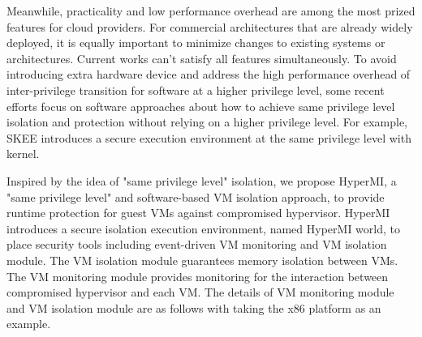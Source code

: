 \documentclass[conference]{IEEEtran}
\begin{document}
Meanwhile, practicality and low performance overhead are among the most prized features for cloud providers. For commercial architectures that are already widely deployed, it is equally important to minimize changes to existing systems or architectures. Current works can't satisfy all features simultaneously. To avoid introducing extra hardware device and address the high performance overhead of inter-privilege transition for software at a higher privilege level, some recent efforts focus on software approaches about how to achieve same privilege level isolation and protection without relying on a higher privilege level. For example, SKEE\cite{Azab2016SKEE} introduces a secure execution environment at the same privilege level with kernel. 


Inspired by the idea of "same privilege level" isolation, we propose HyperMI, a "same privilege level" and software-based VM isolation approach, to provide runtime protection for guest VMs against compromised hypervisor. HyperMI introduces a secure isolation execution environment, named HyperMI world, to place security tools including event-driven VM monitoring and VM isolation module. The VM isolation module guarantees memory isolation between VMs. The VM monitoring module provides monitoring for the interaction between compromised hypervisor and each VM. The details of VM monitoring module and VM isolation module are as follows with taking the x86 platform as an example.

\end{document}
